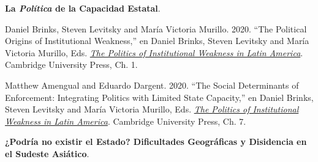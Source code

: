 \documentclass[letterpaper]{article}
\renewenvironment{itemize}{
  \begin{list}{}{
    \setlength{\leftmargin}{1.5em}
  }
}{
  \end{list}
}
\begin{document}
\begin{enumerate}[label=\roman*.]
\begin{itemize}


			\item[9.] {\bf La \emph{Pol\'itica} de la Capacidad Estatal}.
				\begin{itemize}
					\item[$\circ$] Daniel Brinks, Steven Levitsky and Mar\'ia Victoria Murillo. 2020. ``The Political Origins of Institutional Weakness,'' en Daniel Brinks, Steven Levitsky and Mar\'ia Victoria Murillo, Eds. \href{https://github.com/hbahamonde/Ciencia_Politica_II/raw/master/Readings/Brinks_Levitsky_Murillo.pdf}{\emph{The Politics of Institutional Weakness in Latin America}}. Cambridge University Press, Ch. 1.
					
          \item[$\circ$] Matthew Amengual and Eduardo Dargent. 2020. ``The Social Determinants of Enforcement: Integrating Politics with Limited State Capacity,'' en Daniel Brinks, Steven Levitsky and Mar\'ia Victoria Murillo, Eds. \href{https://github.com/hbahamonde/Ciencia_Politica_II/raw/master/Readings/Brinks_Levitsky_Murillo.pdf}{\emph{The Politics of Institutional Weakness in Latin America}}. Cambridge University Press, Ch. 7.
				\end{itemize}



		\item[10.] {\bf ¿Podr\'ia no existir el Estado? Dificultades Geogr\'aficas y Disidencia en el Sudeste Asi\'atico}.
				\begin{itemize}
          


\end{itemize}
\end{itemize}
\end{enumerate}
\end{document}
